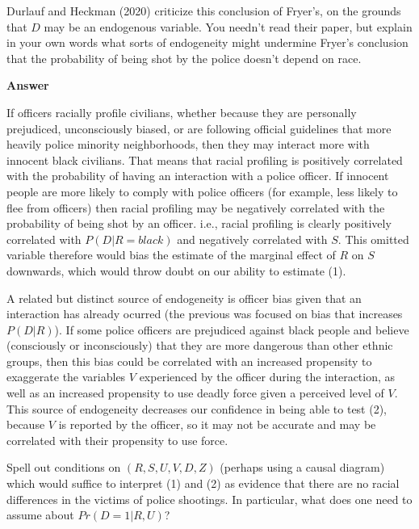 \documentclass[11pt]{exam}
\begin{document}
\begin{questions}
    \question Durlauf and Heckman (2020) criticize this conclusion of
Fryer's, on the grounds that \(D\) may be an endogenous variable. You
needn't read their paper, but explain in your own words what sorts of
endogeneity might undermine Fryer's conclusion that the probability of
being shot by the police doesn't depend on race.

\textbf{Answer}

If officers racially profile civilians, whether because they are
personally prejudiced, unconsciously biased, or are following official
guidelines that more heavily police minority neighborhoods, then they
may interact more with innocent black civilians. That means that racial
profiling is positively correlated with the probability of having an
interaction with a police officer. If innocent people are more likely to
comply with police officers (for example, less likely to flee from
officers) then racial profiling may be negatively correlated with the
probability of being shot by an officer. i.e., racial profiling is
clearly positively correlated with \(P(D | R = black)\) and negatively
correlated with \(S\). This omitted variable therefore would bias the
estimate of the marginal effect of \(R\) on \(S\) downwards,
which would throw doubt on our ability to estimate (1).

A related but distinct source of endogeneity is officer bias given that
an interaction has already ocurred (the previous was focused on bias
that increases \(P(D|R)\)). If some police officers are prejudiced
against black people and believe (consciously or inconsciously) that
they are more dangerous than other ethnic groups, then this bias could
be correlated with an increased propensity to exaggerate the variables
\(V\) experienced by the officer during the interaction, as well as an
increased propensity to use deadly force given a perceived level of
\(V\). This source of endogeneity decreases our confidence in being able
to test (2), because \(V\) is reported by the officer, so it may not be
accurate and may be correlated with their propensity to use force.

    \question Spell out conditions on \((R,S,U,V,D,Z)\) (perhaps using a
causal diagram) which would suffice to interpret (1) and (2) as evidence
that there are no racial differences in the victims of police shootings.
In particular, what does one need to assume about \(Pr(D = 1|R,U)\)?


\end{questions}
\end{document}
